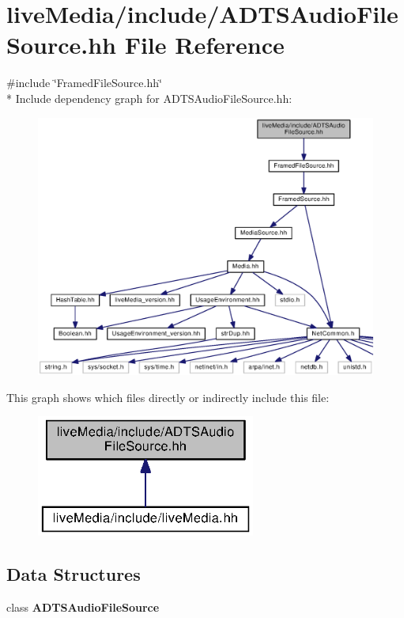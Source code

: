 \section{live\+Media/include/\+A\+D\+T\+S\+Audio\+File\+Source.hh File Reference}
\label{ADTSAudioFileSource_8hh}
{\ttfamily \#include \char`\"{}Framed\+File\+Source.\+hh\char`\"{}}\\*
Include dependency graph for A\+D\+T\+S\+Audio\+File\+Source.\+hh\+:
\nopagebreak
\begin{figure}[H]
\begin{center}
\leavevmode
\includegraphics[width=350pt]{ADTSAudioFileSource_8hh__incl}
\end{center}
\end{figure}
This graph shows which files directly or indirectly include this file\+:
\nopagebreak
\begin{figure}[H]
\begin{center}
\leavevmode
\includegraphics[width=204pt]{ADTSAudioFileSource_8hh__dep__incl}
\end{center}
\end{figure}
\subsection*{Data Structures}
\begin{DoxyCompactItemize}
\item 
class {\bf A\+D\+T\+S\+Audio\+File\+Source}
\end{DoxyCompactItemize}
